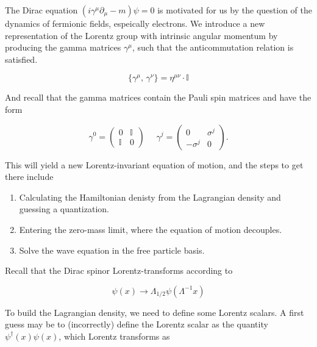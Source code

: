\noindent The Dirac equation $\left( i \gamma^{\mu} \partial_{\mu} - m \right) \psi = 0$ is motivated for us by the question of the dynamics of fermionic fields, espeically electrons. We introduce a new representation of the Lorentz group with intrinsic angular momentum by producing the gamma matrices $\gamma^{\mu}$, such that the anticommutation relation is satisfied. 

\begin{equation}
\{ \gamma^{\mu}, \, \gamma^{\nu} \} = \eta^{\mu\nu} \cdot \mathbb{I}
\end{equation}

\noindent And recall that the gamma matrices contain the Pauli spin matrices and have the form

\begin{equation}
\gamma^0 = \left( \begin{array}{c|c} 0 & \mathbb{I} \\ \hline \mathbb{I} & 0 \end{array} \right) \,\,\,\,\,\,\,\, \gamma^j = \left( \begin{array}{c|c} 0 & \sigma^j \\ \hline -\sigma^j & 0 \end{array} \right) .
\end{equation}

\noindent This will yield a new Lorentz-invariant equation of motion, and the steps to get there include

\begin{enumerate}
\item Calculating the Hamiltonian denisty from the Lagrangian density and guessing a quantization.
\item Entering the zero-mass limit, where the equation of motion decouples.
\item Solve the wave equation in the free particle basis.
\end{enumerate}

\noindent Recall that the Dirac spinor Lorentz-transforms according to 

\begin{equation}
\psi(x) \rightarrow \Lambda_{1/2} \psi (\Lambda^{-1} x)
\end{equation}

\noindent To build the Lagrangian density, we need to define some Lorentz scalars. A first guess may be to (incorrectly) define the Lorentz scalar as the quantity $\psi^\dagger (x) \psi (x)$, which Lorentz transforms as

